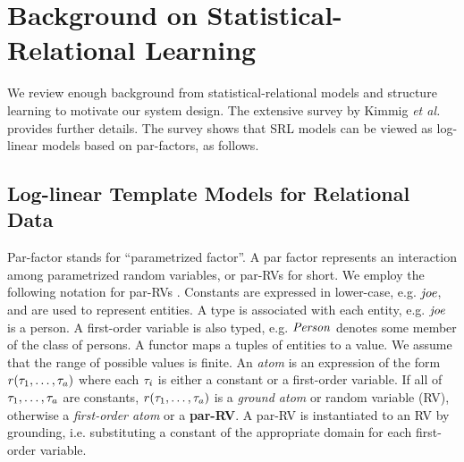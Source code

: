\section{Background on Statistical-Relational Learning} We review enough background from statistical-relational models and structure learning to motivate our system design. The extensive survey by Kimmig {\em et al.} \cite{Kimmig2015} provides further details. The survey shows that SRL models can be viewed as log-linear models based on par-factors, as follows.

\subsection{Log-linear Template Models for Relational Data} \label{sec:log-linear}

Par-factor stands for ``parametrized factor''. A par factor represents an interaction among parametrized random variables, or par-RVs for short. 
We employ the following notation 
for par-RVs \cite[2.2.5]{Kimmig2015}.
	Constants are expressed in lower-case, e.g. $\it{joe}$, and are used to represent entities. A type is associated with each entity, e.g. $\it{joe}$ is a person. 
A first-order variable is also typed, e.g. $\it{Person}$ denotes some member of the class of persons. A functor maps a tuples of entities to a value. We assume that the range of possible values is finite.  An {\em atom} is an expression of the form $r(\tau_{1},\ldots,\tau_{a})$ where each $\tau_{i}$ is either a constant or a first-order variable. If all of $\tau_{1},\ldots,\tau_{a}$ are constants, $r(\tau_{1},\ldots,\tau_{a})$ is a {\em ground atom} or random variable (RV), otherwise a {\em first-order atom} or a \textbf{par-RV}. A par-RV is instantiated to an RV by grounding, i.e. substituting a constant of the appropriate domain for each first-order variable. 

